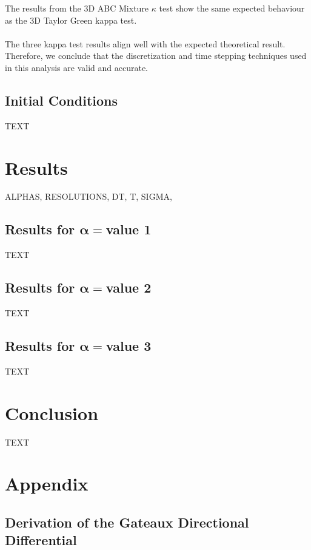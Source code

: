 \documentclass[12pt]{article}
\numberwithin{equation}{section}
\begin{document}
The results from the 3D ABC Mixture $\kappa$ test show the same expected behaviour as the 3D Taylor Green kappa test.
\\~\\
The three kappa test results align well with the expected theoretical result. Therefore, we conclude that the discretization and time stepping techniques used in this analysis are valid and accurate.

\pagebreak

\subsection{Initial Conditions}\label{Inital Conditions}
TEXT
\section{Results}
ALPHAS, RESOLUTIONS, DT, T, SIGMA, 
\subsection{Results for $\boldsymbol{\alpha= }$value 1}
TEXT
\subsection{Results for $\boldsymbol{\alpha= }$value 2}
TEXT
\subsection{Results for $\boldsymbol{\alpha= }$value 3}
TEXT

\section{Conclusion}
TEXT

\section{Appendix}
\subsection{Derivation of the Gateaux Directional Differential}\label{app:gateaux}
\end{document}
